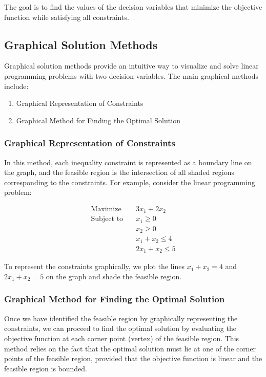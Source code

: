 \documentclass[12pt]{book} %
\begin{document}
The goal is to find the values of the decision variables that minimize the objective function while satisfying all constraints.

\subsection{Graphical Solution Methods}
Graphical solution methods provide an intuitive way to visualize and solve linear programming problems with two decision variables. The main graphical methods include:

\begin{enumerate}
    \item Graphical Representation of Constraints
    \item Graphical Method for Finding the Optimal Solution
\end{enumerate}

\subsubsection{Graphical Representation of Constraints}
In this method, each inequality constraint is represented as a boundary line on the graph, and the feasible region is the intersection of all shaded regions corresponding to the constraints. For example, consider the linear programming problem:

\[
\begin{aligned}
\text{Maximize} \quad & 3x_1 + 2x_2 \\
\text{Subject to} \quad & x_1 \geq 0 \\
& x_2 \geq 0 \\
& x_1 + x_2 \leq 4 \\
& 2x_1 + x_2 \leq 5
\end{aligned}
\]

To represent the constraints graphically, we plot the lines \( x_1 + x_2 = 4 \) and \( 2x_1 + x_2 = 5 \) on the graph and shade the feasible region.

\subsubsection{Graphical Method for Finding the Optimal Solution}
Once we have identified the feasible region by graphically representing the constraints, we can proceed to find the optimal solution by evaluating the objective function at each corner point (vertex) of the feasible region. This method relies on the fact that the optimal solution must lie at one of the corner points of the feasible region, provided that the objective function is linear and the feasible region is bounded.
\end{document}
